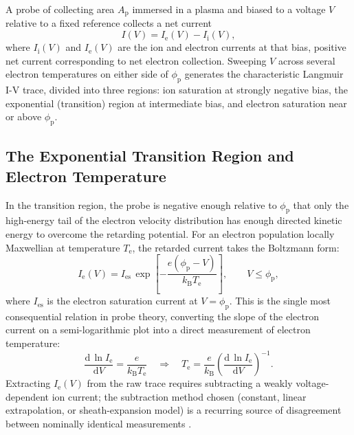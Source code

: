 A probe of collecting area $A_{\mathrm{p}}$ immersed in a plasma and biased to a voltage $V$ relative to a fixed reference collects a net current
\begin{equation}
I(V) = I_{\mathrm{e}}(V) - I_{\mathrm{i}}(V),
\label{eq:probe-net-current}
\end{equation}
where $I_{\mathrm{i}}(V)$ and $I_{\mathrm{e}}(V)$ are the ion and electron currents at that bias, positive net current corresponding to net electron collection. Sweeping $V$ across several electron temperatures on either side of $\phi_{\mathrm{p}}$ generates the characteristic Langmuir I-V trace, divided into three regions: ion saturation at strongly negative bias, the exponential (transition) region at intermediate bias, and electron saturation near or above $\phi_{\mathrm{p}}$.

\subsection{The Exponential Transition Region and Electron Temperature}

In the transition region, the probe is negative enough relative to $\phi_{\mathrm{p}}$ that only the high-energy tail of the electron velocity distribution has enough directed kinetic energy to overcome the retarding potential. For an electron population locally Maxwellian at temperature $T_{\mathrm{e}}$, the retarded current takes the Boltzmann form:
\begin{equation}
I_{\mathrm{e}}(V) = I_{\mathrm{es}} \, \exp\!\left[-\frac{e\left(\phi_{\mathrm{p}} - V\right)}{k_{\mathrm{B}} T_{\mathrm{e}}}\right], \qquad V \le \phi_{\mathrm{p}},
\label{eq:probe-exp-region}
\end{equation}
where $I_{\mathrm{es}}$ is the electron saturation current at $V = \phi_{\mathrm{p}}$. This is the single most consequential relation in probe theory, converting the slope of the electron current on a semi-logarithmic plot into a direct measurement of electron temperature:
\begin{equation}
\frac{\mathrm{d}\,\ln I_{\mathrm{e}}}{\mathrm{d}V} = \frac{e}{k_{\mathrm{B}} T_{\mathrm{e}}}
\quad\Longrightarrow\quad
T_{\mathrm{e}} = \frac{e}{k_{\mathrm{B}}} \left(\frac{\mathrm{d}\,\ln I_{\mathrm{e}}}{\mathrm{d}V}\right)^{-1}.
\label{eq:probe-Te-slope}
\end{equation}
Extracting $I_{\mathrm{e}}(V)$ from the raw trace requires subtracting a weakly voltage-dependent ion current; the subtraction method chosen (constant, linear extrapolation, or sheath-expansion model) is a recurring source of disagreement between nominally identical measurements \cite{ref0217}.

